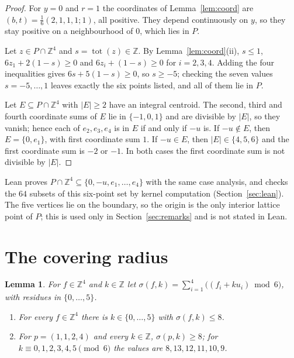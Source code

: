 \documentclass[11pt]{article}
\newtheorem{lemma}{Lemma}
\theoremstyle{definition}
\theoremstyle{remark}
\newcommand{\Z}{\mathbb Z}
\newcommand{\tot}{\operatorname{tot}}
\begin{document}
\begin{proof}
For $y=0$ and $r=1$ the coordinates of Lemma~\ref{lem:coord} are
$(b,t)=\frac16(2,1,1,1;1)$, all positive. They depend continuously on $y$, so
they stay positive on a neighbourhood of $0$, which lies in $P$.

Let $z\in P\cap\Z^4$ and $s=\tot(z)\in\Z$. By Lemma~\ref{lem:coord}(ii), $s\le1$,
$6z_1+2(1-s)\ge0$ and $6z_i+(1-s)\ge0$ for $i=2,3,4$. Adding the four
inequalities gives $6s+5(1-s)\ge0$, so $s\ge-5$; checking the seven values
$s=-5,\dots,1$ leaves exactly the six points listed, and all of them lie in
$P$.

Let $E\subseteq P\cap\Z^4$ with $|E|\ge2$ have an integral centroid. The
second, third and fourth coordinate sums of $E$ lie in $\{-1,0,1\}$ and are
divisible by $|E|$, so they vanish; hence each of $e_2,e_3,e_4$ is in $E$ if
and only if $-u$ is. If $-u\notin E$, then $E=\{0,e_1\}$, with first
coordinate sum $1$. If $-u\in E$, then $|E|\in\{4,5,6\}$ and the first
coordinate sum is $-2$ or $-1$. In both cases the first coordinate sum is not
divisible by $|E|$.
\end{proof}

\noindent Lean proves $P\cap\Z^4\subseteq\{0,-u,e_1,\dots,e_4\}$ with the same
case analysis, and checks the $64$ subsets of this six-point set by kernel
computation (Section~\ref{sec:lean}). The five vertices lie on the boundary,
so the origin is the only interior lattice point of $P$; this is used only in
Section~\ref{sec:remarks} and is not stated in Lean.

\section{The covering radius}\label{sec:radius}

\begin{lemma}\label{lem:residue}
For $f\in\Z^4$ and $k\in\Z$ let
$\sigma(f,k)=\sum_{i=1}^4\bigl((f_i+ku_i)\bmod 6\bigr)$, with residues in
$\{0,\dots,5\}$.
\begin{enumerate}
\item[\textup{(i)}] For every $f\in\Z^4$ there is $k\in\{0,\dots,5\}$ with
$\sigma(f,k)\le8$.
\item[\textup{(ii)}] For $p=(1,1,2,4)$ and every $k\in\Z$, $\sigma(p,k)\ge8$;
for $k\equiv0,1,2,3,4,5\pmod 6$ the values are $8,13,12,11,10,9$.
\end{enumerate}
\end{lemma}
\end{document}
